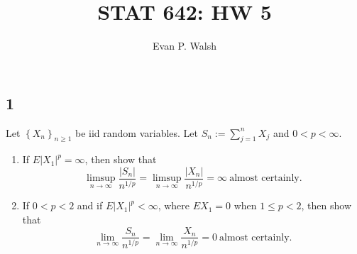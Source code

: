 \documentclass[12pt]{article}
\title{STAT 642: HW 5}
\author{Evan P. Walsh}
\begin{document}
\maketitle

\subsection*{1}
\begin{tcolorbox}
Let $\left\{ X_{n} \right\}_{n\geq 1}$ be iid random variables. Let $S_{n} := \sum_{j=1}^{n}X_{j}$ and $0 < p < \infty$.
\begin{enumerate}[label=(\alph*),topsep=3mm]
\item If $E|X_{1}|^{p} = \infty$, then show that 
\[ \limsup_{n\rightarrow\infty}\frac{|S_{n}|}{n^{1/p}} = \limsup_{n\rightarrow\infty}\frac{|X_{n}|}{n^{1/p}} = \infty \ \text{almost certainly}. \]
\item If $0 < p < 2$ and if $E|X_{1}|^{p} < \infty$, where $EX_{1} = 0$ when $1 \leq p < 2$, then show that 
\[ \lim_{n\rightarrow\infty}\frac{S_{n}}{n^{1/p}} = \lim_{n\rightarrow\infty}\frac{X_{n}}{n^{1/p}} = 0 \ \text{almost certainly}. \]
\end{enumerate}
\end{tcolorbox}
\end{document}
